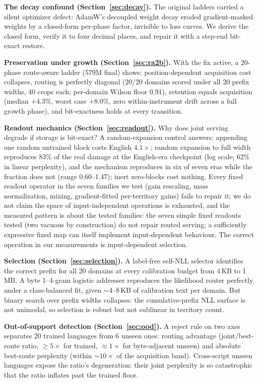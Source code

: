 \documentclass[11pt]{article}
\theoremstyle{definition}\newtheorem{definition}{Definition}
\theoremstyle{remark}\newtheorem{remark}{Remark}
\begin{document}
\textbf{The decay confound (Section~\ref{sec:decay}).} The original ladders carried a silent optimizer defect: AdamW's decoupled weight decay eroded gradient-masked weights by a closed-form per-phase factor, invisible to loss curves. We derive the closed form, verify it to four decimal places, and repair it with a step-end bit-exact restore.

\textbf{Preservation under growth (Section~\ref{sec:ra2b}).} With the fix active, a 20-phase route-aware ladder (579M final) shows: position-dependent acquisition cost collapses, routing is perfectly diagonal (20/20 domains scored under all 20 prefix widths, 40 crops each; per-domain Wilson floor 0.91), retention equals acquisition (median $+4.3\%$, worst case $+8.0\%$, zero within-instrument drift across a full growth phase), and bit-exactness holds at every transition.

\textbf{Readout mechanics (Section~\ref{sec:readout}).} Why does joint serving degrade if storage is bit-exact? A random-expansion control answers: appending one random untrained block costs English $4.1\times$; random expansion to full width reproduces 83\% of the real damage at the English-era checkpoint (log scale; 62\% in linear perplexity), and the mechanism reproduces in six of seven eras while the fraction does not (range 0.60--1.47); inert zero-blocks cost nothing. Every fixed readout operator in the seven families we test (gain rescaling, mass normalization, mixing, gradient-fitted per-territory gains) fails to repair it; we do not claim the space of input-independent operations is exhausted, and the measured pattern is about the tested families: the seven simple fixed readouts tested (two vacuous by construction) do not repair routed serving; a sufficiently expressive fixed map can itself implement input-dependent behaviour. The correct operation in our measurements is input-dependent selection.

\textbf{Selection (Section~\ref{sec:selection}).} A label-free self-NLL selector identifies the correct prefix for all 20 domains at every calibration budget from 4\,KB to 1\,MB. A byte 1--4-gram logistic addresser reproduces the likelihood router perfectly under a class-balanced fit, given $\sim$4--8\,KB of calibration text per domain. But binary search over prefix widths collapses: the cumulative-prefix NLL surface is not unimodal, so selection is robust but not sublinear in territory count.

\textbf{Out-of-support detection (Section~\ref{sec:ood}).} A reject rule on two axes separates 20 trained languages from 6 unseen ones: routing advantage (joint/best-route ratio, $\ge 5\times$ for trained, $\approx 1\times$ for byte-adjacent unseen) and absolute best-route perplexity (within $\sim 10\times$ of the acquisition band). Cross-script unseen languages expose the ratio's degeneration: their joint perplexity is so catastrophic that the ratio inflates past the trained floor.
\end{document}
